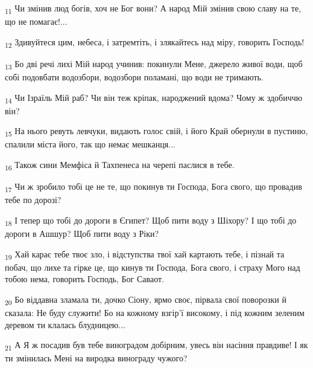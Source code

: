 \begin{tcolorbox}
\textsubscript{11} Чи змінив люд богів, хоч не Бог вони? А народ Мій змінив свою славу на те, що не помагає!...
\end{tcolorbox}
\begin{tcolorbox}
\textsubscript{12} Здивуйтеся цим, небеса, і затремтіть, і злякайтесь над міру, говорить Господь!
\end{tcolorbox}
\begin{tcolorbox}
\textsubscript{13} Бо дві речі лихі Мій народ учинив: покинули Мене, джерело живої води, щоб собі подовбати водозбори, водозбори поламані, що води не тримають.
\end{tcolorbox}
\begin{tcolorbox}
\textsubscript{14} Чи Ізраїль Мій раб? Чи він теж кріпак, народжений вдома? Чому ж здобиччю він?
\end{tcolorbox}
\begin{tcolorbox}
\textsubscript{15} На нього ревуть левчуки, видають голос свій, і його Край обернули в пустиню, спалили міста його, так що немає мешканця...
\end{tcolorbox}
\begin{tcolorbox}
\textsubscript{16} Також сини Мемфіса й Тахпенеса на черепі паслися в тебе.
\end{tcolorbox}
\begin{tcolorbox}
\textsubscript{17} Чи ж зробило тобі це не те, що покинув ти Господа, Бога свого, що провадив тебе по дорозі?
\end{tcolorbox}
\begin{tcolorbox}
\textsubscript{18} І тепер що тобі до дороги в Єгипет? Щоб пити воду з Шіхору? І що тобі до дороги в Ашшур? Щоб пити воду з Ріки?
\end{tcolorbox}
\begin{tcolorbox}
\textsubscript{19} Хай карає тебе твоє зло, і відступства твої хай картають тебе, і пізнай та побач, що лихе та гірке це, що кинув ти Господа, Бога свого, і страху Мого над тобою нема, говорить Господь, Бог Саваот.
\end{tcolorbox}
\begin{tcolorbox}
\textsubscript{20} Бо віддавна зламала ти, дочко Сіону, ярмо своє, пірвала свої поворозки й сказала: Не буду служити! Бо на кожному взгір'ї високому, і під кожним зеленим деревом ти клалась блудницею...
\end{tcolorbox}
\begin{tcolorbox}
\textsubscript{21} А Я ж посадив був тебе виноградом добірним, увесь він насіння правдиве! І як ти змінилась Мені на виродка винограду чужого?
\end{tcolorbox}
